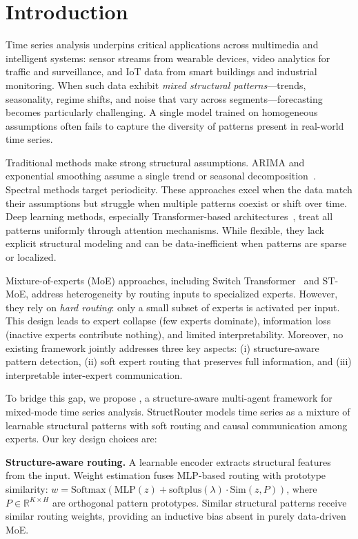 \section{Introduction}

Time series analysis underpins critical applications across multimedia and intelligent systems: sensor streams from wearable devices, video analytics for traffic and surveillance, and IoT data from smart buildings and industrial monitoring. When such data exhibit \emph{mixed structural patterns}---trends, seasonality, regime shifts, and noise that vary across segments---forecasting becomes particularly challenging. A single model trained on homogeneous assumptions often fails to capture the diversity of patterns present in real-world time series.

Traditional methods make strong structural assumptions. ARIMA and exponential smoothing assume a single trend or seasonal decomposition~\cite{box2015time}. Spectral methods target periodicity. These approaches excel when the data match their assumptions but struggle when multiple patterns coexist or shift over time. Deep learning methods, especially Transformer-based architectures~\cite{vaswani2017attention}, treat all patterns uniformly through attention mechanisms. While flexible, they lack explicit structural modeling and can be data-inefficient when patterns are sparse or localized.

Mixture-of-experts (MoE) approaches, including Switch Transformer~\cite{fedus2022switch} and ST-MoE, address heterogeneity by routing inputs to specialized experts. However, they rely on \emph{hard routing}: only a small subset of experts is activated per input. This design leads to expert collapse (few experts dominate), information loss (inactive experts contribute nothing), and limited interpretability. Moreover, no existing framework jointly addresses three key aspects: (i) structure-aware pattern detection, (ii) soft expert routing that preserves full information, and (iii) interpretable inter-expert communication.

To bridge this gap, we propose \model, a structure-aware multi-agent framework for mixed-mode time series analysis. StructRouter models time series as a mixture of learnable structural patterns with soft routing and causal communication among experts. Our key design choices are:

\textbf{Structure-aware routing.} A learnable encoder extracts structural features from the input. Weight estimation fuses MLP-based routing with prototype similarity: $w = \text{Softmax}(\text{MLP}(z) + \text{softplus}(\lambda) \cdot \text{Sim}(z, P))$, where $P \in \mathbb{R}^{K \times H}$ are orthogonal pattern prototypes. Similar structural patterns receive similar routing weights, providing an inductive bias absent in purely data-driven MoE.

